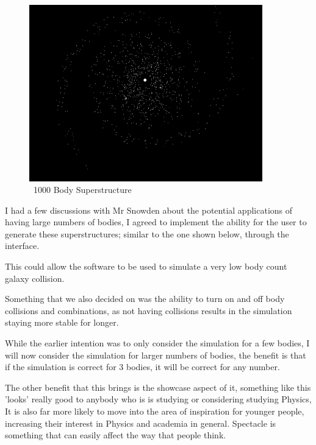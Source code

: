 {\begin{figure}[!ht]
  \centering
  \includegraphics[width=0.9\textwidth]{img/superstructure.png}
  \caption{~1000 Body Superstructure}
\end{figure}

\pagebreak
I had a few discussions with Mr Snowden about the potential applications of having large numbers of bodies, I agreed to implement the ability for the user to generate these superstructures; similar to the one shown below, through the interface. 

This could allow the software to be used to simulate a very low body count galaxy collision.

Something that we also decided on was the ability to turn on and off body collisions and combinations, as not having collisions results in the simulation staying more stable for longer.

While the earlier intention was to only consider the simulation for a few bodies, I will now consider the simulation for larger numbers of bodies, the benefit is that if the simulation is correct for 3 bodies, it will be correct for any number.

The other benefit that this brings is the showcase aspect of it, something like this 'looks' really good to anybody who is is studying or considering studying Physics, It is also far more likely to move into the area of inspiration for younger people, increasing their interest in Physics and academia in general. Spectacle is something that can easily affect the way that people think.

\vspace{8pt}
\pagebreak

}
